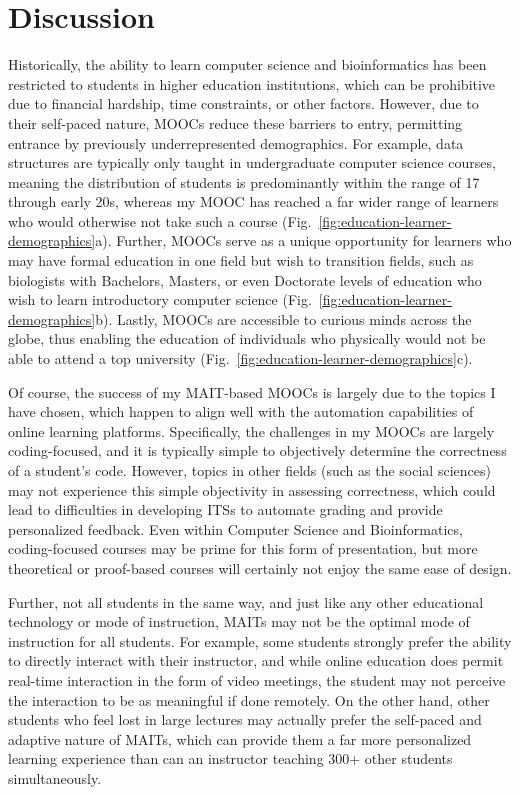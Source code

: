 \section{Discussion}
Historically, the ability to learn computer science and bioinformatics has been restricted to students in higher education institutions, which can be prohibitive due to financial hardship, time constraints, or other factors. However, due to their self-paced nature, \glspl{MOOC} reduce these barriers to entry, permitting entrance by previously underrepresented demographics. For example, data structures are typically only taught in undergraduate computer science courses, meaning the distribution of students is predominantly within the range of 17 through early 20s, whereas my \gls{MOOC} has reached a far wider range of learners who would otherwise not take such a course (Fig.~\ref{fig:education-learner-demographics}a). Further, MOOCs serve as a unique opportunity for learners who may have formal education in one field but wish to transition fields, such as biologists with Bachelors, Masters, or even Doctorate levels of education who wish to learn introductory computer science (Fig.~\ref{fig:education-learner-demographics}b). Lastly, \glspl{MOOC} are accessible to curious minds across the globe, thus enabling the education of individuals who physically would not be able to attend a top university (Fig.~\ref{fig:education-learner-demographics}c).

Of course, the success of my \gls{MAIT}-based \glspl{MOOC} is largely due to the topics I have chosen, which happen to align well with the automation capabilities of online learning platforms. Specifically, the challenges in my \glspl{MOOC} are largely coding-focused, and it is typically simple to objectively determine the correctness of a student's code. However, topics in other fields (such as the social sciences) may not experience this simple objectivity in assessing correctness, which could lead to difficulties in developing \glspl{ITS} to automate grading and provide personalized feedback. Even within Computer Science and Bioinformatics, coding-focused courses may be prime for this form of presentation, but more theoretical or proof-based courses will certainly not enjoy the same ease of design.

Further, not all students in the same way, and just like any other educational technology or mode of instruction, \glspl{MAIT} may not be the optimal mode of instruction for all students. For example, some students strongly prefer the ability to directly interact with their instructor, and while online education does permit real-time interaction in the form of video meetings, the student may not perceive the interaction to be as meaningful if done remotely. On the other hand, other students who feel lost in large lectures may actually prefer the self-paced and adaptive nature of \glspl{MAIT}, which can provide them a far more personalized learning experience than can an instructor teaching 300+ other students simultaneously.

